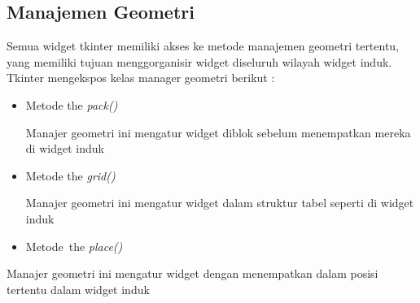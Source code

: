 \documentclass{wileySix}
\begin{document}
\begin{myEnumerate}
{\begin{myEnumerate}
\section{Manajemen Geometri}
 \par
\noindent 
\hspace*{0.5in} Semua widget tkinter memiliki akses ke metode manajemen geometri tertentu, yang memiliki tujuan menggorganisir widget diseluruh wilayah widget induk. Tkinter mengekspos kelas manager geometri berikut : \par
\noindent 
\begin{itemize}
	\item Metode the \textit{pack()} \par
	\noindent 
	Manajer geometri ini mengatur widget diblok sebelum menempatkan mereka di widget induk \par
	\noindent 
	\item Metode the \textit{grid()} \par
	\noindent 
	Manajer geometri ini mengatur widget dalam struktur tabel seperti di widget induk \par
	\noindent 
	\item Metode~the  \textit{place()}\end{itemize}
\par
\noindent 
Manajer geometri ini mengatur widget dengan menempatkan dalam posisi tertentu dalam widget induk \par
\vspace{12pt}


\end{myEnumerate}}
\end{myEnumerate}
\end{document}
